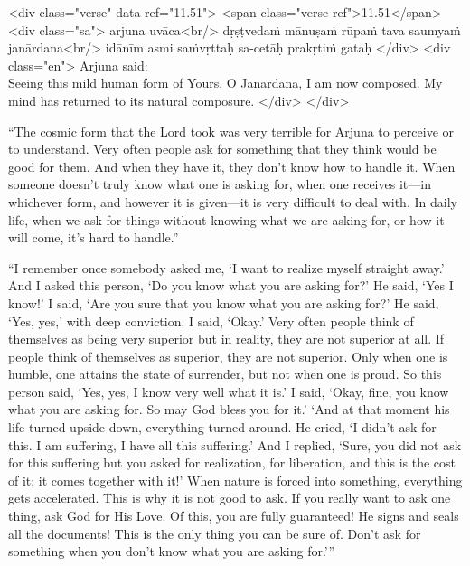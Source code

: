 \begin{html}
<div class="verse" data-ref="11.51">
  <span class="verse-ref">11.51</span>
  <div class="sa">
    arjuna uvāca<br/>
    dṛṣṭvedaṁ mānuṣaṁ rūpaṁ tava saumyaṁ janārdana<br/>
    idānīm asmi saṁvṛttaḥ sa-cetāḥ prakṛtiṁ gataḥ
  </div>
  <div class="en">
    \hspace*{1em}Arjuna said: \\ Seeing this mild human form of Yours, O Janārdana, I am now composed. My mind has returned to its natural composure.
  </div>
</div>
\end{html}


\enquote{The cosmic form that the Lord took was very terrible for Arjuna to perceive or to understand. Very often people ask for something that they think would be good for them. And when they have it, they don’t know how to handle it. When someone doesn’t truly know what one is asking for, when one receives it---in whichever form, and however it is given---it is very difficult to deal with. In daily life, when we ask for things without knowing what we are asking for, or how it will come, it’s hard to handle.}

\enquote{I remember once somebody asked me, \enquote{I want to realize myself straight away.} And I asked this person, \enquote{Do you know what you are asking for?} He said, \enquote{Yes I know!} I said, \enquote{Are you sure that you know what you are asking for?} He said, \enquote{Yes, yes,} with deep conviction. I said, \enquote{Okay.} Very often people think of themselves as being very superior but in reality, they are not superior at all. If people think of themselves as superior, they are not superior. Only when one is humble, one attains the state of surrender, but not when one is proud. So this person said, \enquote{Yes, yes, I know very well what it is.} I said, \enquote{Okay, fine, you know what you are asking for. So may God bless you for it.} \enquote{And at that moment his life turned upside down, everything turned around. He cried, ‘I didn’t ask for this. I am suffering, I have all this suffering.’ And I replied, ‘Sure, you did not ask for this suffering but you asked for realization, for liberation, and this is the cost of it; it comes together with it!’ When nature is forced into something, everything gets accelerated. This is why it is not good to ask. If you really want to ask one thing, ask God for His Love. Of this, you are fully guaranteed! He signs and seals all the documents! This is the only thing you can be sure of. Don’t ask for something when you don’t know what you are asking for.}}

